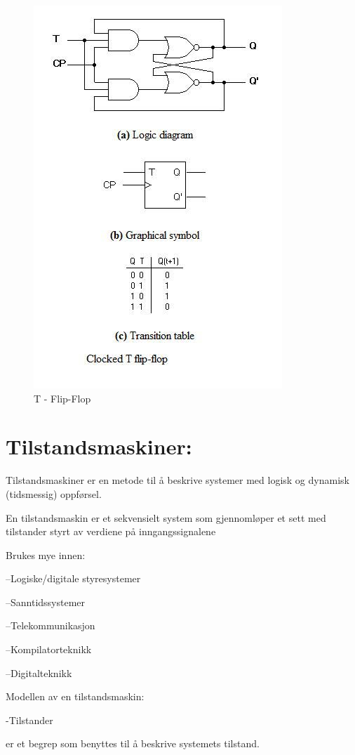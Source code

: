 \documentclass{article}
\begin{document}
	\begin{figure}[H]
		\includegraphics[scale = 0.6]{tFlip2.jpg}
		\caption{T - Flip-Flop}
	\end{figure}
	
	
	\section{Tilstandsmaskiner:}
	Tilstandsmaskiner er en metode til å beskrive systemer med logisk og dynamisk (tidsmessig) oppførsel. 
	
	En tilstandsmaskin er et sekvensielt system som gjennomløper et sett med tilstander styrt av verdiene på inngangssignalene 
	
	Brukes mye innen: 
	
	–Logiske/digitale styresystemer 
	
	–Sanntidssystemer 
	
	–Telekommunikasjon 
	
	–Kompilatorteknikk 
	
	–Digitalteknikk 
	
	Modellen av en tilstandsmaskin:
	
	-Tilstander
	
	er et begrep som benyttes til å beskrive systemets tilstand. 
	 
\end{document}
